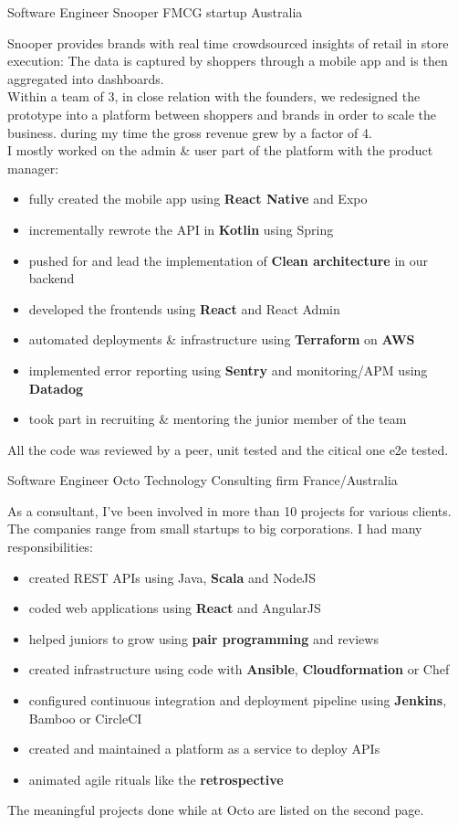 \documentclass[11pt,a4paper]{moderncv}
\begin{document}
{Software Engineer}
{Snooper}
{FMCG startup}
{Australia}
{
Snooper provides brands with real time crowdsourced insights of retail in store execution: 
The data is captured by shoppers through a mobile app and is then aggregated into dashboards.
\\
Within a team of 3, in close relation with the founders, we redesigned the prototype into a platform between shoppers and brands in order to scale the business.
during my time the gross revenue grew by a factor of 4.
\\
I mostly worked on the admin \& user part of the platform with the product manager:
\begin{itemize}
\item fully created the mobile app using \textbf{React Native} and Expo
\item incrementally rewrote the API in \textbf{Kotlin} using Spring
\item pushed for and lead the implementation of \textbf{Clean architecture} in our backend
\item developed the frontends using \textbf{React} and React Admin
\item automated deployments \& infrastructure using \textbf{Terraform} on \textbf{AWS}
\item implemented error reporting using \textbf{Sentry} and monitoring/APM using \textbf{Datadog}
\item took part in recruiting \& mentoring the junior member of the team
\end{itemize}
All the code was reviewed by a peer, unit tested and the citical one e2e tested.
}
\vspace{2mm}
{Software Engineer}
{Octo Technology}
{Consulting firm}
{France/Australia}
{
As a consultant, I've been involved in more than 10 projects for various clients. The companies range from small startups to big corporations. I had many responsibilities:
\begin{itemize}
\item created REST APIs using Java, \textbf{Scala} and NodeJS
\item coded web applications using \textbf{React} and AngularJS
\item helped juniors to grow using \textbf{pair programming} and reviews
\item created infrastructure using code with \textbf{Ansible}, \textbf{Cloudformation} or Chef
\item configured continuous integration and deployment pipeline using \textbf{Jenkins}, Bamboo or CircleCI
\item created and maintained a platform as a service to deploy APIs
\item animated agile rituals like the \textbf{retrospective}
\end{itemize}
The meaningful projects done while at Octo are listed on the second page.
}
\end{document}

